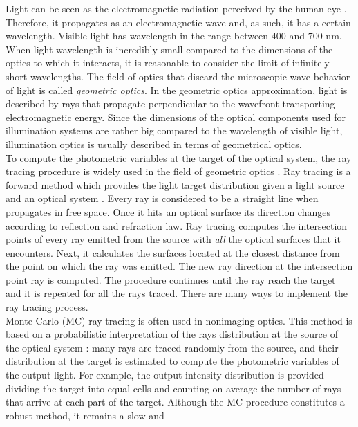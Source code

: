 Light can be seen as the electromagnetic radiation perceived by the human eye \cite{schreuder2008outdoor}. Therefore, it propagates as an electromagnetic wave and, as such, it has a certain wavelength. Visible light has wavelength in the range between $400$ and $700$ nm. When light wavelength is incredibly small compared to the dimensions of the optics to which it interacts, it is reasonable to consider the limit of infinitely short wavelengths. The field of optics that discard the microscopic wave behavior of light is called \textit{geometric optics}. In the geometric optics approximation, light is described by rays that propagate perpendicular to the wavefront transporting electromagnetic energy. Since the dimensions of the optical components used for illumination systems are rather big compared to the wavelength of visible light, illumination optics is usually described in terms of geometrical optics. 
\\ \indent To compute the photometric variables at the target of the
optical system, the ray tracing procedure is widely used in the field of geometric optics \cite{glassner1989introduction}.
Ray tracing is a forward method which provides the light target distribution given a light source and an optical system \cite{Gross2005Handbook}. Every ray is considered to be a straight line when propagates in free space. Once it hits an optical surface its direction changes according to reflection and refraction law. Ray tracing computes the intersection points of every ray emitted from the source with \textit{all} the optical surfaces that it encounters. Next, it calculates the surfaces located at the closest distance from the point on which the ray was emitted. The new ray direction at the intersection point ray is computed. The procedure continues until the ray reach the target and it is repeated for all the rays traced.
There are many ways to implement the ray tracing
process. \\ \indent Monte Carlo (MC) ray tracing is often used in nonimaging
optics. This method is based on a probabilistic interpretation
of the rays distribution at the source of the optical
system \cite{liu2010precise,Ting:1}: many rays are traced randomly from the source,
and their distribution at the target is estimated to compute the
photometric variables of the output light. For example, the output intensity distribution is provided dividing the target into equal cells and counting on average the number of rays that arrive at each part of the target. Although the MC
procedure constitutes a robust method, it remains a slow and
